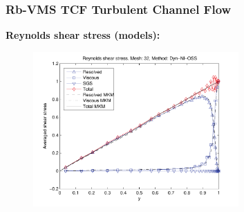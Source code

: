 \begin{frame}[t]
\frametitle{Rb-VMS TCF {\small Turbulent Channel Flow}}
\textbf{Reynolds shear stress (models):}
  \vspace*{-0.3cm}
  \begin{figure}
    \centering	
    \includegraphics[width=0.7\textwidth]{Figures/Rb_TCF/reystr_395_Dyn_Nl_OSS.pdf}
  \end{figure}
  \vspace*{-0.5cm}
  \begin{overlayarea}{\textwidth}{1.5cm}
  \end{overlayarea}
\end{frame}
\addtocounter{framenumber}{-1}
